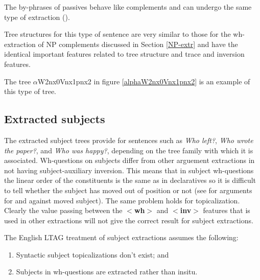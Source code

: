 
The by-phrases of passives behave like complements and can undergo the
same type of extraction ().


Tree structures for this type of sentence are very similar to those
for the wh-extraction of NP complements discussed in Section \ref{NP-extr} and
have the identical important features related to tree structure and
trace and inversion features.

The tree $\alpha$W2nx0Vnx1pnx2 in figure \ref{alphaW2nx0Vnx1pnx2} is
an example of this type of tree.

\begin{figure}[htbp]
\end{figure}



\subsection{Extracted subjects}

The extracted subject trees provide for sentences such as {\it Who
left?}, {\it Who wrote the paper?}, and {\it Who was happy?},
depending on the tree family with which it is associated.
Wh-questions on subjects differ from other arguement extractions in
not having subject-auxiliary inversion.  This means that in subject
wh-questions the linear order of the constituents is the same as in
declaratives so it is difficult to tell whether the subject has moved
out of position or not (see \cite{heycock/kroch93gagl} for arguments
for and against moved subject). The same problem holds for
topicalization. Clearly the value passing between the {\bf $<$wh$>$}
and {\bf $<$inv$>$} features that is used in other extractions will
not give the correct result for subject extractions.

The English LTAG treatment of subject extractions assumes the
following:

\begin{enumerate}
\item Syntactic subject topicalizations don't exist; and 
\item Subjects in wh-questions are extracted rather than insitu.
\end{enumerate}

